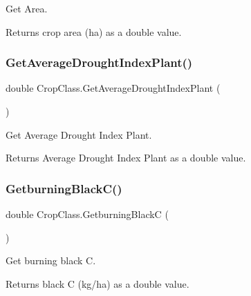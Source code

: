 Get Area. 

\begin{DoxyReturn}{Returns}
crop area (ha) as a double value. 
\end{DoxyReturn}
\mbox{\label{class_crop_class_aa859e71adecc03738e986fb81d0396ea}} 
\subsubsection{\texorpdfstring{GetAverageDroughtIndexPlant()}{GetAverageDroughtIndexPlant()}}
{\footnotesize\ttfamily double Crop\+Class.\+Get\+Average\+Drought\+Index\+Plant (\begin{DoxyParamCaption}{ }\end{DoxyParamCaption})\hspace{0.3cm}{\ttfamily [inline]}}



Get Average Drought Index Plant. 

\begin{DoxyReturn}{Returns}
Average Drought Index Plant as a double value. 
\end{DoxyReturn}
\mbox{\label{class_crop_class_a173b98eb2eeae57f6d3704a3ac4ff256}} 
\subsubsection{\texorpdfstring{GetburningBlackC()}{GetburningBlackC()}}
{\footnotesize\ttfamily double Crop\+Class.\+Getburning\+BlackC (\begin{DoxyParamCaption}{ }\end{DoxyParamCaption})\hspace{0.3cm}{\ttfamily [inline]}}



Get burning black C. 

\begin{DoxyReturn}{Returns}
black C (kg/ha) as a double value. 
\end{DoxyReturn}
\mbox{\label{class_crop_class_a6098219aab64aa4db6f74775d59ca4b9}} 
